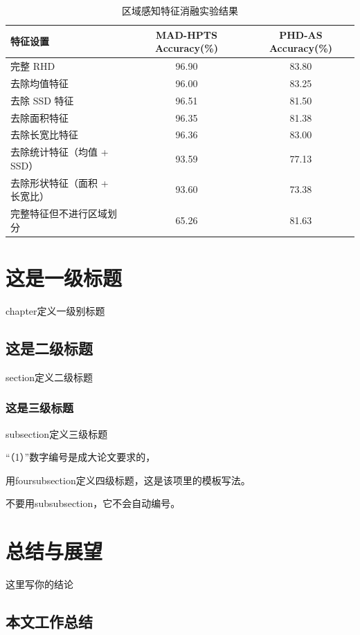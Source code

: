 \documentclass[UTF8,twoside]{ctexrep}
\begin{document}
\begin{table}[htb]
    \centering
    \caption{区域感知特征消融实验结果}
    \begin{tabular}{lcc}
        \toprule
        特征设置 & MAD-HPTS Accuracy(\%) & PHD-AS Accuracy(\%) \\
        \midrule
        完整 RHD & 96.90 & 83.80 \\
        去除均值特征 & 96.00 & 83.25 \\
        去除 SSD 特征 & 96.51 & 81.50 \\
        去除面积特征 & 96.35 & 81.38 \\
        去除长宽比特征 & 96.36 & 83.00 \\
        去除统计特征（均值 + SSD） & 93.59 & 77.13 \\
        去除形状特征（面积 + 长宽比） & 93.60 & 73.38 \\
        完整特征但不进行区域划分 & 65.26 & 81.63 \\
        \bottomrule
    \end{tabular}
    \label{tab:rhd_ablation}
\end{table}


\chapter{这是一级标题}
chapter定义一级别标题

\section{这是二级标题}
section定义二级标题

\subsection{这是三级标题}
subsection定义三级标题

“（1）”数字编号是成大论文要求的，

用foursubsection定义四级标题，这是该项里的模板写法。

不要用subsubsection，它不会自动编号。




\chapter{总结与展望}
这里写你的结论
\section{本文工作总结}
\end{document}
